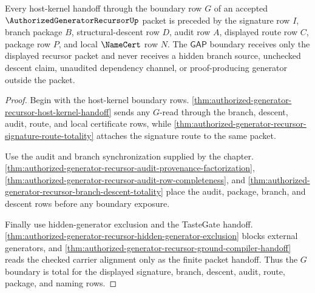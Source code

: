 \begin{theorem}
\label{thm:authorized-generator-recursor-gap-boundary-totality}
Every host-kernel handoff through the boundary row $G$ of an accepted $\AuthorizedGeneratorRecursorUp$ packet is preceded by the signature row $I$, branch package $B$, structural-descent row $D$, audit row $A$, displayed route row $C$, package row $P$, and local $\NameCert$ row $N$. The $\mathsf{GAP}$ boundary receives only the displayed recursor packet and never receives a hidden branch source, unchecked descent claim, unaudited dependency channel, or proof-producing generator outside the packet.
\end{theorem}
\begin{proof}
Begin with the host-kernel boundary rows. \autoref{thm:authorized-generator-recursor-host-kernel-handoff} sends any $G$-read through the branch, descent, audit, route, and local certificate rows, while \autoref{thm:authorized-generator-recursor-signature-route-totality} attaches the signature route to the same packet.

Use the audit and branch synchronization supplied by the chapter. \autoref{thm:authorized-generator-recursor-audit-provenance-factorization}, \autoref{thm:authorized-generator-recursor-audit-row-completeness}, and \autoref{thm:authorized-generator-recursor-branch-descent-totality} place the audit, package, branch, and descent rows before any boundary exposure.

Finally use hidden-generator exclusion and the TasteGate handoff. \autoref{thm:authorized-generator-recursor-hidden-generator-exclusion} blocks external generators, and \autoref{thm:authorized-generator-recursor-ground-compiler-handoff} reads the checked carrier alignment only as the finite packet handoff. Thus the $G$ boundary is total for the displayed signature, branch, descent, audit, route, package, and naming rows.
\end{proof}

